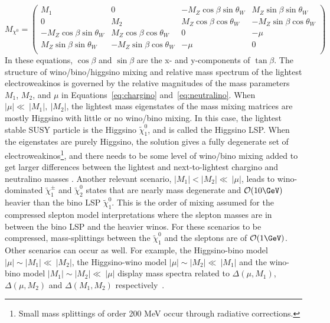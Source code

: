 \begin{equation}
M_{\chi^0}=
\begin{pmatrix}
M_1 & 0 & -M_Z\cos\beta \sin\theta_W & M_Z\sin\beta \sin\theta_W\\
0 & M_2 & M_Z\cos\beta \cos\theta_W & -M_Z\sin\beta \cos\theta_W\\
-M_Z\cos\beta \sin\theta_W & M_Z\cos\beta \cos\theta_W & 0 & -\mu \\
M_Z\sin\beta \sin\theta_W & -M_Z\sin\beta \cos\theta_W & -\mu & 0 \\
\end{pmatrix}
\label{eq:neutralino}
\end{equation}
In these equations, $\cos\beta$ and $\sin\beta$ are the x- and y-components of $\tan\beta$.  The structure of wino/bino/higgsino mixing and relative mass spectrum of the lightest electroweakinos is governed by the relative magnitudes of the mass parameters $M_1$, $M_2$, and $\mu$ in Equations~\ref{eq:chargino} and~\ref{eq:neutralino}.  When $|\mu|\ll~|M_1|,~|M_2|$, the lightest mass eigenstates of the mass mixing matrices are mostly Higgsino with little or no wino/bino mixing.  In this case, the lightest stable SUSY particle is the Higgsino $\tilde\chi_1^0$, and is called the Higgsino LSP.  When the eigenstates are purely Higgsino, the solution gives a fully degenerate set of electroweakinos\footnote{Small mass splittings of order 200 MeV occur through radiative corrections.}, and there needs to be some level of wino/bino mixing added to get larger differences between the lightest and next-to-lightest chargino and neutralino masses \cite{PhysRevD.93.063525}.  Another relevant scenario, $|M_1| <|M_2|\ll~|\mu|$, leads to wino-dominated $\tilde\chi_1^\pm$ and $\tilde\chi_2^0$ states that are nearly mass degenerate and $\mathcal{O}(10\GeV)$ heavier than the bino LSP $\tilde\chi_1^0$.  This is the order of mixing assumed for the compressed slepton model interpretations where the slepton masses are in between the bino LSP and the heavier winos.  For these scenarios to be compressed, mass-splittings between the $\tilde\chi_1^0$ and the sleptons are of $\mathcal{O}(1\GeV)$.  Other scenarios can occur as well.  For example, the Higgsino-bino model $|\mu|\sim |M_1|\ll~|M_2|$, the Higgsino-wino model $|\mu|\sim |M_2|\ll~|M_1|$ and the wino-bino model $|M_1|\sim |M_2|\ll~|\mu|$ display mass spectra related to $\Delta(\mu, M_1)$, $\Delta(\mu, M_2)$ and $\Delta(M_1, M_2)$ respectively~\cite{PhysRevD.96.055018}.  



